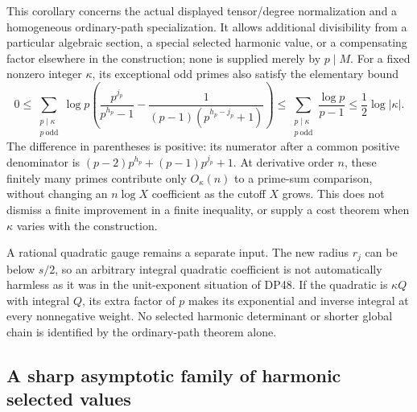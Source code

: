 \documentclass[11pt,a4paper]{article}
\theoremstyle{definition}\newtheorem{remark}[theorem]{Remark}
\begin{document}
This corollary concerns the actual displayed tensor/degree normalization and a homogeneous ordinary-path specialization. It allows additional divisibility from a particular algebraic section, a special selected harmonic value, or a compensating factor elsewhere in the construction; none is supplied merely by $p\mid M$.
For a fixed nonzero integer $\kappa$, its exceptional odd primes also satisfy the elementary bound
\[
 0\le\sum_{\substack{p\mid\kappa\\p\ \mathrm{odd}}}\log p
 \left(\frac{p^{j_p}}{p^{h_p}-1}
       -\frac1{(p-1)(p^{h_p-j_p}+1)}\right)
 \le\sum_{\substack{p\mid\kappa\\p\ \mathrm{odd}}}\frac{\log p}{p-1}
 \le\frac12\log|\kappa|.
\]
The difference in parentheses is positive: its numerator after a common positive denominator is
$(p-2)p^{h_p}+(p-1)p^{j_p}+1$.
At derivative order $n$, these finitely many primes contribute only $O_\kappa(n)$ to a prime-sum comparison, without changing an $n\log X$ coefficient as the cutoff $X$ grows. This does not dismiss a finite improvement in a finite inequality, or supply a cost theorem when $\kappa$ varies with the construction.

A rational quadratic gauge remains a separate input. The new radius $r_j$ can be below $s/2$, so an arbitrary integral quadratic coefficient is not automatically harmless as it was in the unit-exponent situation of DP48. If the quadratic is $\kappa Q$ with integral $Q$, its extra factor of $p$ makes its exponential and inverse integral at every nonnegative weight. No selected harmonic determinant or shorter global chain is identified by the ordinary-path theorem alone.


\subsection{A sharp asymptotic family of harmonic selected values}
\end{document}
